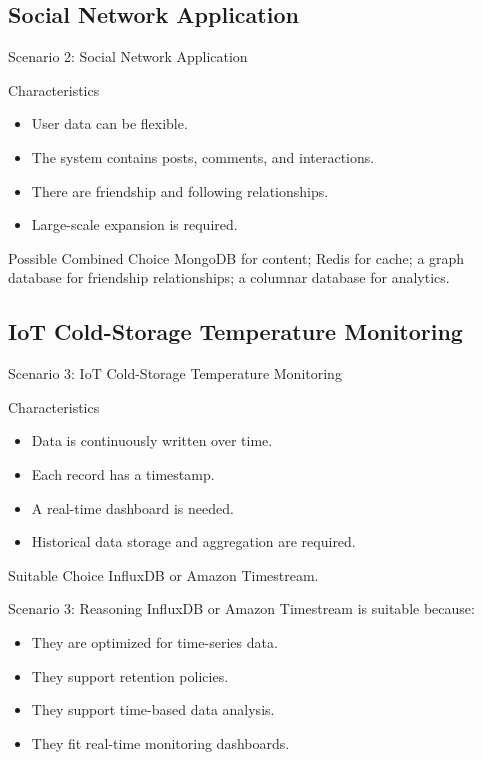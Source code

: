 \documentclass[aspectratio=169,11pt]{beamer}
\newcommand{\smallitem}{\setlength{\itemsep}{2pt}\setlength{\parskip}{0pt}}
\begin{document}
\subsection{Social Network Application}
\begin{frame}{Scenario 2: Social Network Application}
\begin{block}{Characteristics}
\begin{itemize}
  \smallitem
  \item User data can be flexible.
  \item The system contains posts, comments, and interactions.
  \item There are friendship and following relationships.
  \item Large-scale expansion is required.
\end{itemize}
\end{block}

\begin{exampleblock}{Possible Combined Choice}
MongoDB for content; Redis for cache; a graph database for friendship relationships; a columnar database for analytics.
\end{exampleblock}
\end{frame}

\subsection{IoT Cold-Storage Temperature Monitoring}
\begin{frame}{Scenario 3: IoT Cold-Storage Temperature Monitoring}
\begin{block}{Characteristics}
\begin{itemize}
  \smallitem
  \item Data is continuously written over time.
  \item Each record has a timestamp.
  \item A real-time dashboard is needed.
  \item Historical data storage and aggregation are required.
\end{itemize}
\end{block}

\begin{exampleblock}{Suitable Choice}
InfluxDB or Amazon Timestream.
\end{exampleblock}
\end{frame}

\begin{frame}{Scenario 3: Reasoning}
InfluxDB or Amazon Timestream is suitable because:
\begin{itemize}
  \smallitem
  \item They are optimized for time-series data.
  \item They support retention policies.
  \item They support time-based data analysis.
  \item They fit real-time monitoring dashboards.
\end{itemize}
\end{frame}
\end{document}
